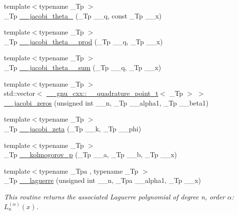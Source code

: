 \begin{DoxyCompactItemize}
\item 
{\footnotesize template$<$typename \+\_\+\+Tp $>$ }\\\+\_\+\+Tp \hyperlink{namespacestd_1_1____detail_a0e4199a4d77f33d27b09063b25c99b7f}{\+\_\+\+\_\+jacobi\+\_\+theta\+\_} (\+\_\+\+Tp \+\_\+\+\_\+q, const \+\_\+\+Tp \+\_\+\+\_\+x)
\item 
{\footnotesize template$<$typename \+\_\+\+Tp $>$ }\\\+\_\+\+Tp \hyperlink{namespacestd_1_1____detail_a577345a46215dd84c03eb4c760dbf7f4}{\+\_\+\+\_\+jacobi\+\_\+theta\+\_\+\_\+prod} (\+\_\+\+Tp \+\_\+\+\_\+q, \+\_\+\+Tp \+\_\+\+\_\+x)
\item 
{\footnotesize template$<$typename \+\_\+\+Tp $>$ }\\\+\_\+\+Tp \hyperlink{namespacestd_1_1____detail_a6f1dd356335537ad693089ccb8d8c755}{\+\_\+\+\_\+jacobi\+\_\+theta\+\_\+\_\+sum} (\+\_\+\+Tp \+\_\+\+\_\+q, \+\_\+\+Tp \+\_\+\+\_\+x)
\item 
{\footnotesize template$<$typename \+\_\+\+Tp $>$ }\\std\+::vector$<$ \hyperlink{struct____gnu__cxx_1_1____quadrature__point__t}{\+\_\+\+\_\+gnu\+\_\+cxx\+::\+\_\+\+\_\+quadrature\+\_\+point\+\_\+t}$<$ \+\_\+\+Tp $>$ $>$ \hyperlink{namespacestd_1_1____detail_a53800598007d45e144cf147c2408a3d6}{\+\_\+\+\_\+jacobi\+\_\+zeros} (unsigned int \+\_\+\+\_\+n, \+\_\+\+Tp \+\_\+\+\_\+alpha1, \+\_\+\+Tp \+\_\+\+\_\+beta1)
\item 
{\footnotesize template$<$typename \+\_\+\+Tp $>$ }\\\+\_\+\+Tp \hyperlink{namespacestd_1_1____detail_a1d5fc69202703d72974c4370fd7ade03}{\+\_\+\+\_\+jacobi\+\_\+zeta} (\+\_\+\+Tp \+\_\+\+\_\+k, \+\_\+\+Tp \+\_\+\+\_\+phi)
\item 
{\footnotesize template$<$typename \+\_\+\+Tp $>$ }\\\+\_\+\+Tp \hyperlink{namespacestd_1_1____detail_a826af8d14ad1914733d751cbb4561957}{\+\_\+\+\_\+kolmogorov\+\_\+p} (\+\_\+\+Tp \+\_\+\+\_\+a, \+\_\+\+Tp \+\_\+\+\_\+b, \+\_\+\+Tp \+\_\+\+\_\+x)
\item 
{\footnotesize template$<$typename \+\_\+\+Tpa , typename \+\_\+\+Tp $>$ }\\\+\_\+\+Tp \hyperlink{namespacestd_1_1____detail_a9e0b69452cb6c0ca0115c516afd46816}{\+\_\+\+\_\+laguerre} (unsigned int \+\_\+\+\_\+n, \+\_\+\+Tpa \+\_\+\+\_\+alpha1, \+\_\+\+Tp \+\_\+\+\_\+x)
\begin{DoxyCompactList}\small\item\em This routine returns the associated Laguerre polynomial of degree n, order $ \alpha $\+: $ L_n^{(\alpha)}(x) $. \end{DoxyCompactList}\item 

\end{DoxyCompactItemize}

